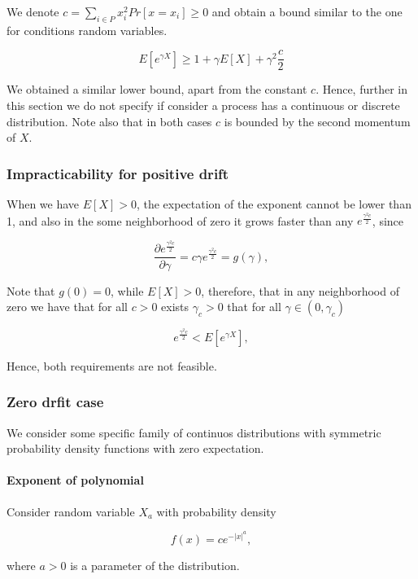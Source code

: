 \documentclass[12pt, a4paper]{article}
\theoremstyle{remark}
\newcommand{\expx}[1]{e^{-|x|^{#1}}}
\begin{document}
We denote $c = \sum_{i \in P} x_i^2 Pr[x = x_i] \geq 0$ and obtain a bound similar to the one for conditions random variables.

\[
    E[e^{\gamma X}] \geq 1 + \gamma E[X] + \gamma^2 \frac{c}{2}
\]


We obtained a similar lower bound, apart from the constant \(c\). Hence,
further in this section we do not specify if consider a process has a continuous or discrete distribution. Note also that in both cases \(c\) is bounded by the second momentum of \(X\).

\subsubsection{Impracticability for positive drift}

When we have \(E\left[X\right] > 0\), the expectation of the exponent cannot be lower than 1, and also in the some neighborhood of zero it grows faster than any $e^{\frac{\gamma^2 c}{2}}$, since

$$\frac{\partial e^{\frac{\gamma^2 c}{2}}}{\partial \gamma} = c\gamma e^{\frac{\gamma^2 c}{2}} = g(\gamma),$$

Note that $g(0) = 0$, while $E[X] > 0$, therefore, that in any neighborhood of zero we have that for all \(c>0\) exists \(\gamma_c > 0\)  that for all \(\gamma \in (0, \gamma_c)\) 

$$e^{\frac{\gamma^2 c}{2}} < E[e^{\gamma X}],$$


Hence, both requirements are not feasible.

\subsubsection{Zero drfit case}
\label{sec:zero}

We consider some specific family of continuos distributions with symmetric probability density functions with zero expectation.

\paragraph*{Exponent of polynomial}

\hfill

\hfill

Consider random variable \(X_a\) with probability density

$$f(x) = c \expx{a},$$

where \(a > 0\) is a parameter of the distribution.
\end{document}
